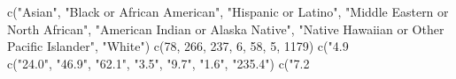 c("Asian", "Black or African American", "Hispanic or Latino", "Middle Eastern or North African", "American Indian or Alaska Native", "Native Hawaiian or Other Pacific Islander", "White")
c(78, 266, 237, 6, 58, 5, 1179)
c("4.9\\%
c("24.0", "46.9", "62.1", "3.5", "9.7", "1.6", "235.4")
c("7.2\\%
